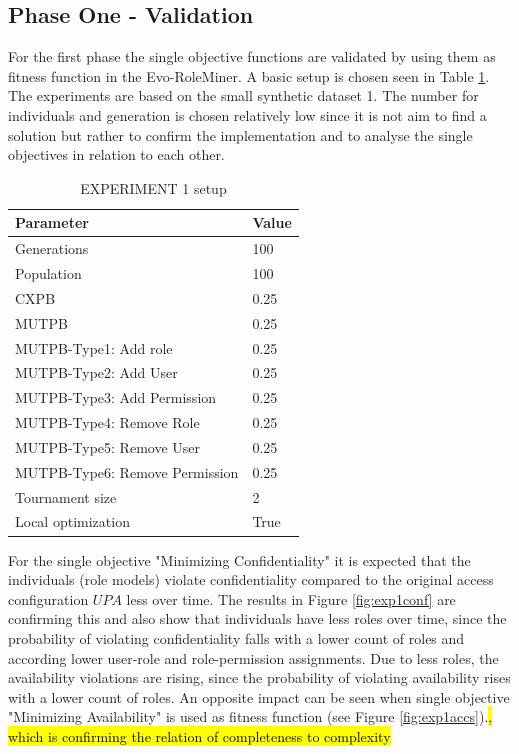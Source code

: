 \newpage
\subsection{Phase One - Validation}
\label{sec:phase1}
For the first phase the single objective functions are validated by using them as fitness function in the Evo-RoleMiner. A basic setup is chosen seen in Table \ref{tab:setup1}. The experiments are based on the small synthetic dataset 1. The number for individuals and generation is chosen relatively low since it is not aim to find a solution but rather to confirm the implementation and to analyse the single objectives in relation to each other. \\
\begin{table}[H]
    \centering
    \begin{tabular}{|l|l|}
        \hline
        \rowcolor{gray!25} 
        \textbf{Parameter}              & \textbf{Value}    \\ \hline
        Generations                     & 100              \\ \hline
        Population                      & 100              \\ \hline
        CXPB                            & 0.25              \\ \hline
        MUTPB                           & 0.25              \\ \hline
        MUTPB-Type1: Add role           & 0.25              \\ \hline
        MUTPB-Type2: Add User           & 0.25              \\ \hline
        MUTPB-Type3: Add Permission     & 0.25              \\ \hline
        MUTPB-Type4: Remove Role        & 0.25              \\ \hline
        MUTPB-Type5: Remove User        & 0.25              \\ \hline
        MUTPB-Type6: Remove Permission  & 0.25              \\ \hline
        Tournament size                 & 2                 \\ \hline
        Local optimization              & True              \\ \hline
    \end{tabular}
    \caption{EXPERIMENT 1 setup}
    \label{tab:setup1}
\end{table}
For the single objective "Minimizing Confidentiality" it is expected that the individuals (role models) violate confidentiality compared to the original access configuration $UPA$ less over time. The results in Figure \ref{fig:exp1conf} are confirming this and also show that individuals have less roles over time, since the probability of violating confidentiality falls with a lower count of roles and according lower user-role and role-permission assignments. Due to less roles, the availability violations are rising, since the probability of violating availability rises with a lower count of roles. An opposite impact can be seen when single objective "Minimizing Availability" is used as fitness function (see Figure \ref{fig:exp1accs}).\hl{, which is confirming the relation of completeness to complexity}\\

